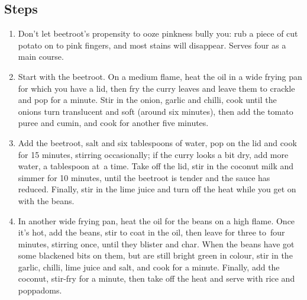 \documentclass{book}
\begin{document}
\subsection*{Steps}
\begin{enumerate}
\item Don’t let beetroot’s propensity to ooze pinkness bully you: rub a piece of cut potato on to pink fingers, and most stains will disappear. Serves four as a main course.
\item Start with the beetroot. On a medium flame, heat the oil in a wide frying pan for which you have a lid, then fry the curry leaves and leave them to crackle and pop for a minute. Stir in the onion, garlic and chilli, cook until the onions turn translucent and soft (around six minutes), then add the tomato puree and cumin, and cook for another five minutes.
\item Add the beetroot, salt and six tablespoons of water, pop on the lid and cook for 15 minutes, stirring occasionally; if the curry looks a bit dry, add more water, a tablespoon at a time. Take off the lid, stir in the coconut milk and simmer for 10 minutes, until the beetroot is tender and the sauce has reduced. Finally, stir in the lime juice and turn off the heat while you get on with the beans.
\item In another wide frying pan, heat the oil for the beans on a high flame. Once it’s hot, add the beans, stir to coat in the oil, then leave for three to four minutes, stirring once, until they blister and char. When the beans have got some blackened bits on them, but are still bright green in colour, stir in the garlic, chilli, lime juice and salt, and cook for a minute. Finally, add the coconut, stir-fry for a minute, then take off the heat and serve with rice and poppadoms.
\end{enumerate}
\newpage
\end{document}
